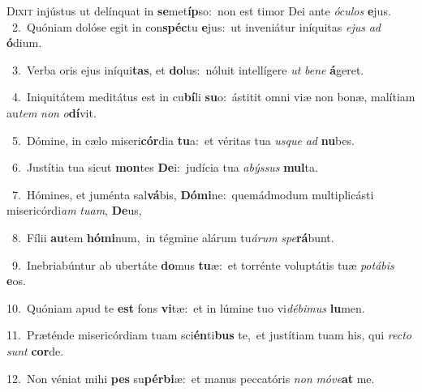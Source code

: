 \lettrine{\initial\textcolor{\initialcolor}{D}}{ixit} injústus ut delínquat in \textbf{se}\-met\-\textbf{íp}\-so:~\star non est timor Dei ante \textit{ó}\-\textit{cu}\textit{los} \textbf{e}\-jus.\\
{\numbfont\textcolor{\numbcolor}{~2.}}~Quóniam dolóse egit in con\-\textbf{spéc}\-tu \textbf{e}\-jus:~\star ut inveniátur iníquitas \textit{e}\-\textit{jus} \textit{ad} \textbf{ó}\-dium.\par
{\numbfont\textcolor{\numbcolor}{~3.}}~Verba oris ejus iníqui\-\textbf{tas}\-, et \textbf{do}\-lus:~\star nóluit intellígere \textit{ut} \textit{be}\-\textit{ne} \textbf{á}\-geret.\par
{\numbfont\textcolor{\numbcolor}{~4.}}~Iniquitátem meditátus est in cu\-\textbf{bí}\-li \textbf{su}\-o:~\star ástitit omni viæ non bonæ, malítiam au\textit{tem} \textit{non} \textit{o}\-\textbf{dí}vit.\par
{\numbfont\textcolor{\numbcolor}{~5.}}~Dómine, in cælo miseri\-\textbf{cór}\-dia \textbf{tu}\-a:~\star et véritas tua \textit{us}\-\textit{que} \textit{ad} \textbf{nu}\-bes.\par
{\numbfont\textcolor{\numbcolor}{~6.}}~Justítia tua sicut \textbf{mon}\-tes \textbf{De}\-i:~\star judícia tua \textit{a}\-\textit{býs}\textit{sus} \textbf{mul}\-ta.\par
{\numbfont\textcolor{\numbcolor}{~7.}}~Hómines, et juménta sal\-\textbf{vá}\-bis, \textbf{Dó}\-\textbf{mi}ne:~\star quemádmodum multiplicásti misericórdi\textit{am} \textit{tu}\-\textit{am}, \textbf{De}\-us,\par
{\numbfont\textcolor{\numbcolor}{~8.}}~Fílii \textbf{au}\-tem \textbf{hó}\-\textbf{mi}num,~\star in tégmine alárum tu\-\textit{á}\-\textit{rum} \textit{spe}\-\textbf{rá}bunt.\par
{\numbfont\textcolor{\numbcolor}{~9.}}~Inebriabúntur ab ubertáte \textbf{do}\-mus \textbf{tu}\-æ:~\star et torrénte voluptátis tuæ \textit{po}\-\textit{tá}\textit{bis} \textbf{e}\-os.\par
{\numbfont\textcolor{\numbcolor}{10.}}~Quóniam apud te \textbf{est} fons \textbf{vi}\-tæ:~\star et in lúmine tuo vi\-\textit{dé}\-\textit{bi}\textit{mus} \textbf{lu}\-men.\par
{\numbfont\textcolor{\numbcolor}{11.}}~Præténde misericórdiam tuam sci\-\textbf{én}\-ti\textbf{bus} te,~\star et justítiam tuam his, qui \textit{rec}\-\textit{to} \textit{sunt} \textbf{cor}\-de.\par
{\numbfont\textcolor{\numbcolor}{12.}}~Non véniat mihi \textbf{pes} su\-\textbf{pér}\-\textbf{bi}æ:~\star et manus peccatóris \textit{non} \textit{mó}\-\textit{ve}\textbf{at} me.\par
